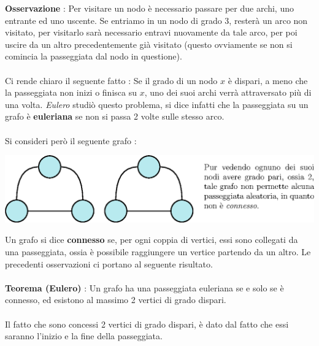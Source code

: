 \documentclass[12pt, letterpaper]{article}
\newcommand{\acc}{\\\hphantom{}\\}
\begin{document}
\textbf{Osservazione} : Per visitare un nodo è necessario passare per due archi, uno entrante ed uno uscente. 
Se entriamo in un nodo di grado 3, resterà un arco non visitato, per visitarlo sarà necessario entravi nuovamente 
da tale arco, per poi uscire da un altro precedentemente già visitato (questo ovviamente se non si comincia la 
passeggiata dal nodo in questione).\acc 
Ci rende chiaro il seguente fatto : Se il grado di un nodo $x$ è dispari, a meno che la passeggiata non inizi 
o finisca su $x$, uno dei suoi archi verrà attraversato più di una volta. \textit{Eulero} studiò questo problema, 
si dice infatti che la passeggiata su un grafo è \textbf{euleriana} se non si passa 2 volte sulle stesso arco.\acc 
Si consideri però il seguente grafo :\begin{center}
    \includegraphics[width=1\textwidth ]{images/nonConnesso.eps}
\end{center}
Un grafo si dice \textbf{connesso} se, per ogni coppia di vertici, essi sono collegati da una passeggiata, 
ossia è possibile raggiungere un vertice partendo da un altro. Le precedenti osservazioni ci portano al 
seguente risultato.\acc 
\textbf{Teorema (Eulero)} : Un grafo ha una passeggiata euleriana se e solo se è connesso, ed 
esistono al massimo 2 vertici di grado dispari.\acc 
Il fatto che sono concessi 2 vertici di grado dispari, è dato dal fatto che essi saranno l'inizio e la fine 
della passeggiata.
\end{document}
